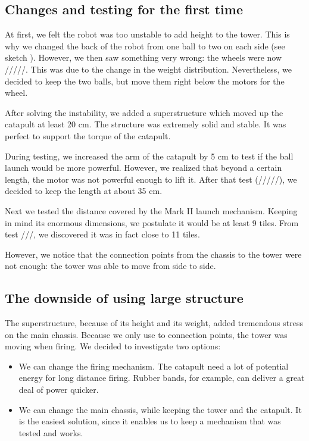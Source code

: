 \documentclass[]{article}
\begin{document}
\subsection{Changes and testing for the first time  }
At first, we felt the robot was too unstable to add height to the tower.  This is why we changed the back of the robot from one ball to two on each side (see sketch ).  However, we then saw something very wrong: the wheels were now /////.  This was due to the change in the weight distribution.  Nevertheless, we decided to keep the two balls, but move them right below the motors for the wheel.

After solving the instability, we added a superstructure which moved up the catapult at least 20 cm.  The structure was extremely solid and stable.  It was perfect to support the torque of the catapult. 

During testing, we increased the arm of the catapult by 5 cm to test if the ball launch would be more powerful.  However, we realized that beyond a certain length, the motor was not powerful enough to lift it.  After that test (/////), we decided to keep the length at about 35 cm.

Next we tested the distance covered by the Mark II launch mechanism.  Keeping in mind its enormous dimensions, we postulate it would be at least 9 tiles.  From test ///, we discovered it was in fact close to 11 tiles.

However, we notice that the connection points from the chassis to the tower were not enough: the tower was able to move from side to side.

\subsection{The downside of using large structure}  
The superstructure, because of its height and its weight, added tremendous stress on the main chassis.  Because we only use to connection points, the tower was moving when firing.  We decided to investigate two options:
\begin{itemize}
\item We can change the firing mechanism.  The catapult need a lot of potential energy for long distance firing.  Rubber bands, for example, can deliver a great deal of power quicker.

\item We can change the main chassis, while keeping the tower and the catapult.  It is the easiest solution, since it enables us to keep a mechanism that was tested and works.
\end{itemize}
\end{document}

